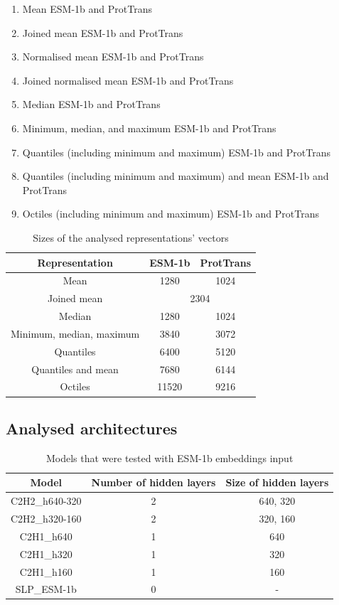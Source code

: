 \documentclass[12pt]{article}
\begin{document}
	\begin{enumerate}
		\item Mean ESM-1b and ProtTrans 
		\item Joined mean ESM-1b and ProtTrans
		\item Normalised mean ESM-1b and ProtTrans
		\item Joined normalised mean ESM-1b and ProtTrans
		\item Median ESM-1b and ProtTrans
		\item Minimum, median, and maximum ESM-1b and ProtTrans
		\item Quantiles (including minimum and maximum) ESM-1b and ProtTrans
		\item Quantiles (including minimum and maximum) and mean ESM-1b and ProtTrans
		\item Octiles (including minimum and maximum) ESM-1b and ProtTrans
	\end{enumerate}

	\begin{table}[h!]
		\caption{Sizes of the analysed representations' vectors}
		\vspace{0.2cm}
		\centering
		\begin{tabular}{ | c | c c | }
			\hline 
			Representation & ESM-1b & ProtTrans \\
			\hline 
			Mean & 1280 & 1024 \\
			Joined mean & \multicolumn{2}{c|}{2304} \\
			Median & 1280 & 1024 \\
			Minimum, median, maximum & 3840 & 3072 \\
			Quantiles & 6400 & 5120 \\
			Quantiles and mean & 7680 & 6144 \\
			Octiles & 11520 & 9216 \\
			\hline    
		\end{tabular}
		\label{table:vectorsDimensions}
	\end{table}

	\newpage

	\subsection{Analysed architectures}

	\begin{table}[h!]
		\caption{Models that were tested with ESM-1b embeddings input}
		\vspace{0.2cm}
		\centering
		\begin{tabular}{ | c | c c | }
			\hline 
			Model & Number of hidden layers & Size of hidden layers \\
			\hline 
			C2H2\_h640-320 & 2 & 640, 320 \\
			C2H2\_h320-160 & 2 & 320, 160 \\
			C2H1\_h640 & 1 & 640 \\
			C2H1\_h320 & 1 & 320 \\
			C2H1\_h160 & 1 & 160 \\
			SLP\_ESM-1b & 0 & - \\
			\hline    
		\end{tabular}
		\label{table:modelArchitecturesESM}
	\end{table}
\end{document}

